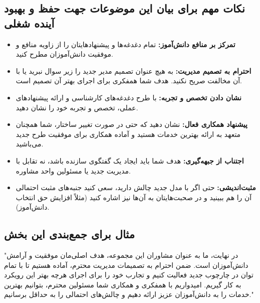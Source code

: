 \documentclass[12pt]{article}
\begin{document}
\subsection*{نکات مهم برای بیان این موضوعات جهت حفظ و بهبود آینده شغلی}
\begin{itemize}
    \item \textbf{تمرکز بر منافع دانش‌آموز:} تمام دغدغه‌ها و پیشنهادهایتان را از زاویه منافع و موفقیت دانش‌آموزان مطرح کنید.
    \item \textbf{احترام به تصمیم مدیریت:} به هیچ عنوان تصمیم مدیر جدید را زیر سوال نبرید یا با آن مخالفت صریح نکنید. هدف شما همفکری برای اجرای بهتر آن تصمیم است.
    \item \textbf{نشان دادن تخصص و تجربه:} با طرح دغدغه‌های کارشناسی و ارائه پیشنهادهای عملی، تخصص و تجربه خود را نشان دهید.
    \item \textbf{پیشنهاد همکاری فعال:} نشان دهید که حتی در صورت تغییر ساختار، شما همچنان متعهد به ارائه بهترین خدمات هستید و آماده همکاری برای موفقیت طرح جدید می‌باشید.
    \item \textbf{اجتناب از جبهه‌گیری:} هدف شما باید ایجاد یک گفتگوی سازنده باشد، نه تقابل با مدیریت جدید یا مسئولین واحد مشاوره.
    \item \textbf{مثبت‌اندیشی:} حتی اگر با مدل جدید چالش دارید، سعی کنید جنبه‌های مثبت احتمالی آن را هم ببینید و در صحبت‌هایتان به آن‌ها نیز اشاره کنید (مثلاً افزایش حق انتخاب دانش‌آموز).
\end{itemize}

\subsection*{مثال برای جمع‌بندی این بخش}
\noindent
"در نهایت، ما به عنوان مشاوران این مجموعه، هدف اصلی‌مان موفقیت و آرامش دانش‌آموزان است. ضمن احترام به تصمیمات مدیریت محترم، آماده هستیم تا با تمام توان در چارچوب جدید فعالیت کنیم و تجارب خود را برای اجرای هرچه بهتر این رویکرد به کار گیریم. امیدواریم با همفکری و همکاری شما مسئولین محترم، بتوانیم بهترین خدمات را به دانش‌آموزان عزیز ارائه دهیم و چالش‌های احتمالی را به حداقل برسانیم."
\end{document}
